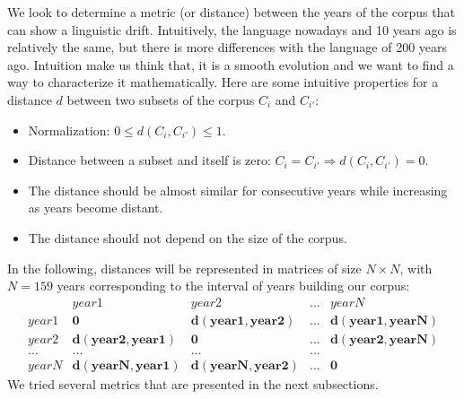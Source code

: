 
We look to determine a metric (or distance) between the years of the corpus that can show a linguistic drift. Intuitively, the language nowadays and 10 years ago is relatively the same, but there is more differences with the language of 200 years ago. Intuition make us think that, it is a smooth evolution and we want to find a way to characterize it mathematically. Here are some intuitive properties for a distance $d$ between two subsets of the corpus $C_i$ and $C_{i'}$:

\begin{itemize}
 \item Normalization: $0 \leq d(C_i,C_{i'}) \leq 1$.
 \item Distance between a subset and itself is zero: $C_i = C_{i'} \Rightarrow d(C_i,C_{i'}) = 0$.
 \item The distance should be almost similar for consecutive years while increasing as years become distant.
 \item The distance should not depend on the size of the corpus.
\end{itemize}

In the following, distances will be represented in matrices of size $N \times N$, with $N = 159$ years corresponding to the interval of years building our corpus:
\[
\begin{matrix}
 & year1 & year2 & ... & yearN \\
 year1 & \mathbf{0} & \mathbf{d(year1,year2)} & ... & \mathbf{d(year1,yearN)} \\
 year2 & \mathbf{d(year2,year1)} & \mathbf{0} & ... & \mathbf{d(year2,yearN)} \\
 ... & ... & ... & ... \\
 yearN & \mathbf{d(yearN,year1)} & \mathbf{d(yearN,year2)} & ... & \mathbf{0}
\end{matrix}
\]
We tried several metrics that are presented in the next subsections.
